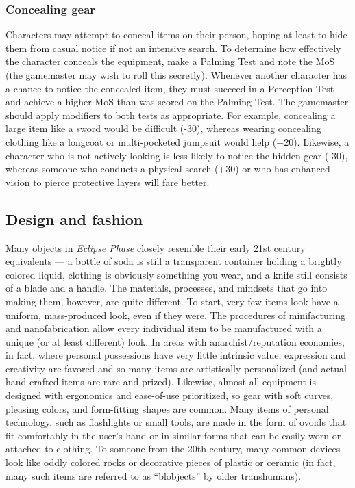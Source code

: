 \subsubsection{Concealing gear}

Characters may attempt to conceal items on their person, hoping at least to hide them from casual notice if not an intensive search. To determine how effectively the character conceals the equipment, make a Palming Test and note the MoS (the gamemaster may wish to roll this secretly). Whenever another character has a chance to notice the concealed item, they must succeed in a Perception Test and achieve a higher MoS than was scored on the Palming Test. The gamemaster should apply modifiers to both tests as appropriate. For example, concealing a large item like a sword would be difficult (-30), whereas wearing concealing clothing like a longcoat or multi-pocketed jumpsuit would help (+20). Likewise, a character who is not actively looking is less likely to notice the hidden gear (-30), whereas someone who conducts a physical search (+30) or who has enhanced vision to pierce protective layers will fare better.


\subsection{Design and fashion}
\label{sec:design-fashion}

Many objects in \emph{Eclipse Phase} closely resemble their early 21st century equivalents --- a bottle of soda is still a transparent container holding a brightly colored liquid, clothing is obviously something you wear, and a knife still consists of a blade and a handle. The materials, processes, and mindsets that go into making them, however, are quite different. To start, very few items look have a uniform, mass-produced look, even if they were. The procedures of minifacturing and nanofabrication allow every individual item to be manufactured with a unique (or at least different) look. In areas with anarchist/reputation economies, in fact, where personal possessions have very little intrinsic value, expression and creativity are favored and so many items are artistically personalized (and actual hand-crafted items are rare and prized). Likewise, almost all equipment is designed with ergonomics and ease-of-use prioritized, so gear with soft curves, pleasing colors, and form-fitting shapes are common. Many items of personal technology, such as flashlights or small tools, are made in the form of ovoids that fit comfortably in the user’s hand or in similar forms that can be easily worn or attached to clothing. To someone from the 20th century, many common devices look like oddly colored rocks or decorative pieces of plastic or ceramic (in fact, many such items are referred to as ``blobjects'' by older transhumans).

